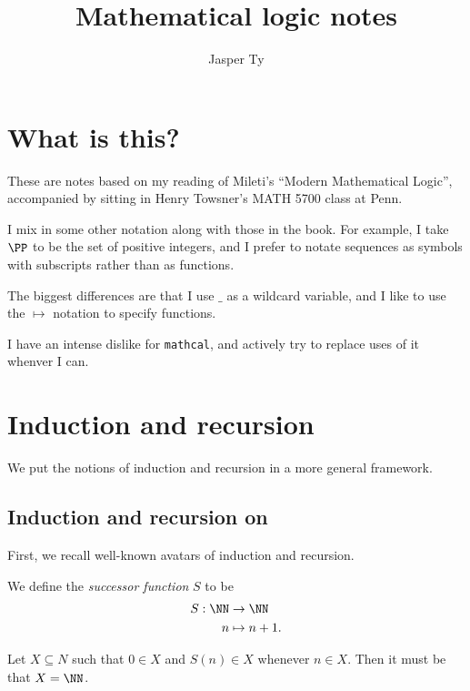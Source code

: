\documentclass{article}
\title{Mathematical logic notes}
\author{Jasper Ty}
\date{}
\begin{document}
\maketitle

\section*{What is this?}

These are notes based on my reading of Mileti's ``Modern Mathematical Logic'', accompanied by sitting in Henry Towsner's \textsc{MATH 5700} class at Penn.

I mix in some other notation along with those in the book.
For example, I take $\PP$ to be the set of positive integers, and I prefer to notate sequences as symbols with subscripts rather than as functions.

The biggest differences are that I use $\_$ as a wildcard variable, and I like to use the $\mapsto$ notation to specify functions.

I have an intense dislike for \texttt{mathcal}, and actively try to replace uses of it whenver I can.

\tableofcontents

\setcounter{section}{1}
\section{Induction and recursion}

We put the notions of induction and recursion in a more general framework.

\subsection{Induction and recursion on \texorpdfstring{\NN}{N}}

First, we recall well-known avatars of induction and recursion.

\begin{definition}
    We define the \textit{successor function} $S$ to be
    \begin{align*}
        S: \NN &\to \NN \\
        n &\mapsto n+1.
    \end{align*}
\end{definition}

\begin{theorem}
    Let $X \subseteq N$ such that $0 \in X$ and $S(n) \in X$ whenever $n \in X$.
    Then it must be that $X = \NN$.
\end{theorem}
\end{document}
